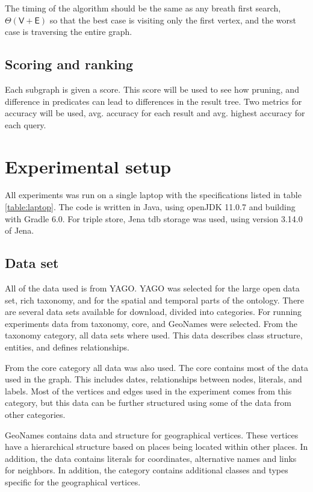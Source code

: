 The timing of the algorithm should be the same as any breath first search, $\Theta(\mathsf{V} + \mathsf{E})$ so that the best case is visiting only the first vertex, and the worst case is traversing the entire graph.

\subsection{Scoring and ranking}
Each subgraph is given a score. This score will be used to see how pruning, and difference in predicates can lead to differences in the result tree. Two metrics for accuracy will be used, avg. accuracy for each result and avg. highest accuracy for each query.

\section{Experimental setup}
\label{sec:experimentalSetup}
All experiments was run on a single laptop with the specifications listed in table \ref{table:laptop}. The code is written in Java, using openJDK 11.0.7 and building with Gradle 6.0. For triple store, Jena tdb storage was used, using version 3.14.0 of Jena.


\subsection{Data set}
All of the data used is from YAGO. YAGO was selected for the large open data set, rich taxonomy, and for the spatial and temporal parts of the ontology. There are several data sets available for download, divided into categories. For running experiments data from taxonomy, core, and GeoNames were selected. From the taxonomy category, all data sets where used. This data describes class structure, entities, and defines relationships.

From the core category all data was also used. The core contains most of the data used in the graph. This includes dates, relationships between nodes, literals, and labels. Most of the vertices and edges used in the experiment comes from this category, but this data can be further structured using some of the data from other categories.

GeoNames contains data and structure for geographical vertices. These vertices have a hierarchical structure based on places being located within other places. In addition, the data contains literals for coordinates, alternative names and links for neighbors. In addition, the category contains additional classes and types specific for the geographical vertices.

